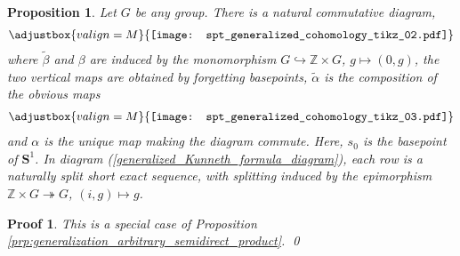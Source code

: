 \documentclass[sort&compress]{elsarticle}
\theoremstyle{theoremstyle}
\newtheorem{prp}[nul]{Proposition}
\theoremstyle{framedtheoremstyle}
\theoremstyle{definitionstyle}
\theoremstyle{definitionstyle}
\theoremstyle{definitionstyle}
\theoremstyle{definitionstyle}
\theoremstyle{nameddefinitionstyle}
\theoremstyle{framednameddefinitionstyle}
\theoremstyle{proofstyle}
\newtheorem{pf}{Proof}
\theoremstyle{definitionstyle}
\newcommand{\oneone}{\hookrightarrow}
\newcommand{\onto}{\twoheadrightarrow}
\newcommand{\ZZZ}{\mathbb{Z}}
\renewcommand{\SS}{\mathbf{S}}
\newcommand{\isomorphic}{\cong}
\newcommand{\paren}[1]{\left( #1 \right)}
\newcommand{\angles}[1]{\left\langle #1 \right\rangle}
\newcommand{\brackets}[1]{\left[ #1 \right]}
\newcommand{\braces}[1]{\left\{ #1 \right\}}
\begin{document}
\begin{appendices}

\begin{prp}\label{prp:generalized_Kunneth_formula}
Let $G$ be any group. There is a natural commutative diagram,
\begin{eqnarray}
\adjustbox{valign=M}{\texttt{[image: spt\_generalized\_cohomology\_tikz\_02.pdf]}}
\label{generalized_Kunneth_formula_diagram}
\end{eqnarray}
where $\tilde \beta$ and $\beta$ are induced by the monomorphism $G \oneone \ZZZ\times G$, $g\mapsto (0,g)$, the two vertical maps are obtained by forgetting basepoints, $\tilde \alpha$ is the composition of the obvious maps
\begin{eqnarray}
\adjustbox{valign=M}{\texttt{[image: spt\_generalized\_cohomology\_tikz\_03.pdf]}}
\end{eqnarray}
and $\alpha$ is the unique map making the diagram commute. Here, $s_0$ is the basepoint of $\SS^1$. In diagram (\ref{generalized_Kunneth_formula_diagram}), each row is a naturally split short exact sequence, with splitting induced by the epimorphism $\ZZZ \times G \onto G$, $(i,g) \mapsto g$.
\end{prp}

\begin{pf}%
This is a special case of Proposition \ref{prp:generalization_arbitrary_semidirect_product}.
\qed\end{pf}


\end{appendices}
\end{document}
